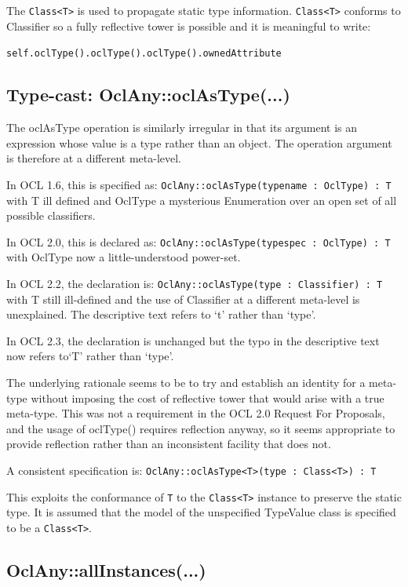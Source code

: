 \documentclass{eceasst}
\begin{document}
The \verb!Class<T>! is used to propagate static type information. \verb!Class<T>! conforms to Classifier so a fully reflective tower is possible and it is meaningful to write:

 \verb!self.oclType().oclType().oclType().ownedAttribute!

\subsection{Type-cast: OclAny::oclAsType(...)}

The oclAsType operation is similarly irregular in that its argument is an expression whose value is a type rather than an object. The operation argument is therefore at a different meta-level.

In OCL 1.6, this is specified as: \verb!OclAny::oclAsType(typename : OclType) : T!  with T ill defined and OclType a mysterious Enumeration over an open set of all possible classifiers.

In OCL 2.0, this is declared as: \verb!OclAny::oclAsType(typespec : OclType) : T! with OclType now a little-understood power-set.

In OCL 2.2, the declaration is: \verb!OclAny::oclAsType(type : Classifier) : T! with T still ill-defined and the use of Classifier at a different meta-level is unexplained. The descriptive text refers to `t' rather than `type'.

In OCL 2.3, the declaration is unchanged but the typo in the descriptive text now refers to`T' rather than `type'.

The underlying rationale seems to be to try and establish an identity for a meta-type without imposing the cost of reflective tower that would arise with a true meta-type. This was not a requirement in the OCL 2.0 Request For Proposals\cite{OCL-RFP}, and the usage of oclType() requires reflection anyway, so it seems appropriate to provide reflection rather than an inconsistent facility that does not.

A consistent specification is: \verb!OclAny::oclAsType<T>(type : Class<T>) : T!

This exploits the conformance of \verb!T! to the \verb!Class<T>! instance to preserve the static type. It is assumed that the model of the unspecified TypeValue class is specified to be a \verb!Class<T>!. 

\subsection{OclAny::allInstances(...)}
\end{document}
